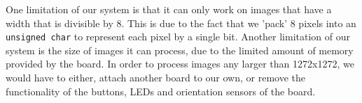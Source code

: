 \documentclass{article}
\begin{document}
\begin{multicols}{2}
\vspace{3mm}

One limitation of our system is that it can only work on images that have a width that is divisible by
8. This is due to the fact that we 'pack' 8 pixels into an \texttt{unsigned char} to represent each pixel by
a single bit. Another limitation of our system is the size of images it can process, due to the limited
amount of memory provided by the board. In order to process images any larger than 1272x1272, we would
have to either, attach another board to our own, or remove the functionality of the buttons, LEDs and
orientation sensors of the board.

\end{multicols}

\newpage

\end{document}
